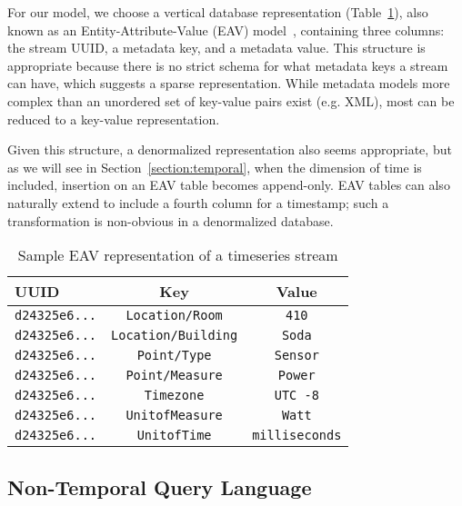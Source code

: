 For our model, we choose a vertical database representation (Table~\ref{table:eavstream}), also known
as an Entity-Attribute-Value (EAV) model~\cite{chen1976entity}, containing
three columns: the stream UUID, a metadata key, and a metadata value. This
structure is appropriate because there is no strict schema for what metadata
keys a stream can have, which suggests a sparse representation. While metadata
models more complex than an unordered set of key-value pairs exist (e.g. XML),
most can be reduced to a key-value representation.

Given this structure, a denormalized representation also seems appropriate,
but as we will see in Section~\ref{section:temporal}, when the dimension of time
is included, insertion on an EAV table becomes append-only. EAV tables can also
naturally extend to include a fourth column for a timestamp; such a transformation
is non-obvious in a denormalized database.

\begin{table}
\centering
\begin{tabular}{|l|c|c|}
\hline
\textbf{UUID} & \textbf{Key} & \textbf{Value} \\
\hline
\texttt{d24325e6...} & \texttt{Location/Room}       & \texttt{410} \\
\texttt{d24325e6...} & \texttt{Location/Building}   & \texttt{Soda} \\
\texttt{d24325e6...} & \texttt{Point/Type}          & \texttt{Sensor} \\
\texttt{d24325e6...} & \texttt{Point/Measure}       & \texttt{Power} \\
\texttt{d24325e6...} & \texttt{Timezone}            & \texttt{UTC -8} \\
\texttt{d24325e6...} & \texttt{UnitofMeasure}       & \texttt{Watt} \\
\texttt{d24325e6...} & \texttt{UnitofTime}          & \texttt{milliseconds} \\
\hline
\end{tabular}
\caption{Sample EAV representation of a timeseries stream}
\label{table:eavstream}
\end{table}


\subsection{Non-Temporal Query Language}

